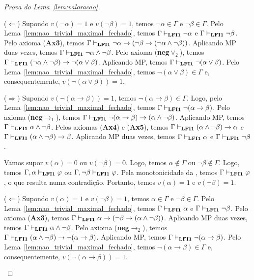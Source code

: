 \begin{proof}[Prova do Lema~\ref{lem:valoracao}]
\begin{provaporcasos}
\begin{adjustwidth}{1cm}{}
                        \noindent ($\Longleftarrow$) Supondo $v(\neg \alpha) = 1$ e $v(\neg \beta) = 1$, temos $\neg \alpha \in \Gamma$ e $\neg \beta \in \Gamma$. Pelo Lema~\ref{lem:nao_trivial_maximal_fechado}, temos $\Gamma \vdash_{{\normalfont\textbf{LFI1}}{}} \neg \alpha$ e $\Gamma \vdash_{{\normalfont\textbf{LFI1}}{}} \neg \beta$. Pelo axioma (\textbf{Ax3}), temos $\Gamma \vdash_{{\normalfont\textbf{LFI1}}{}} \neg \alpha \to (\neg \beta \to (\neg \alpha \land \neg \beta))$. Aplicando MP duas vezes, temos $\Gamma \vdash_{{\normalfont\textbf{LFI1}}{}} \neg \alpha \land \neg \beta$. Pelo axioma (\textbf{neg}$\lor_2$), temos $\Gamma \vdash_{{\normalfont\textbf{LFI1}}{}} (\neg \alpha \land \neg \beta) \to \neg (\alpha \lor \beta)$. Aplicando MP, temos $\Gamma \vdash_{{\normalfont\textbf{LFI1}}{}} \neg (\alpha \lor \beta)$. Pelo Lema~\ref{lem:nao_trivial_maximal_fechado}, temos $\neg (\alpha \lor \beta) \in \Gamma$ e, consequentemente, $v(\neg (\alpha \lor \beta)) = 1$.

                    \end{adjustwidth}


                    \begin{adjustwidth}{1cm}{}
                        
                        \noindent ($\Longrightarrow$) Supondo $v(\neg (\alpha \to \beta)) = 1$, temos $\neg (\alpha \to \beta) \in \Gamma$. Logo, pelo Lema~\ref{lem:nao_trivial_maximal_fechado}, temos $\Gamma \vdash_{{\normalfont\textbf{LFI1}}{}} \neg (\alpha \to \beta)$. Pelo axioma (\textbf{neg}$\to_1$), temos $\Gamma \vdash_{{\normalfont\textbf{LFI1}}{}} \neg (\alpha \to \beta) \to (\alpha \land \neg \beta)$. Aplicando MP, temos $\Gamma \vdash_{{\normalfont\textbf{LFI1}}{}} \alpha \land \neg \beta$. Pelos axiomas (\textbf{Ax4}) e (\textbf{Ax5}), temos $\Gamma \vdash_{{\normalfont\textbf{LFI1}}{}} (\alpha \land \neg \beta) \to \alpha$ e $\Gamma \vdash_{{\normalfont\textbf{LFI1}}{}} (\alpha \land \neg \beta) \to \beta$. Aplicando MP duas vezes, temos $\Gamma \vdash_{{\normalfont\textbf{LFI1}}{}} \alpha$ e $\Gamma \vdash_{{\normalfont\textbf{LFI1}}{}} \neg \beta$.

                        \noindent Vamos supor $v(\alpha) = 0$ ou $v(\neg \beta) = 0$. Logo, temos $\alpha \not \in \Gamma$ ou $\neg \beta \not \in \Gamma$. Logo, temos $\Gamma, \alpha \vdash_{{\normalfont\textbf{LFI1}}{}} \varphi$ ou $\Gamma, \neg \beta \vdash_{{\normalfont\textbf{LFI1}}{}} \varphi$. Pela monotonicidade da \lfium{}, temos $\Gamma \vdash_{{\normalfont\textbf{LFI1}}{}} \varphi$, o que resulta numa contradição. Portanto, temos $v(\alpha) = 1$ e $v(\neg \beta) = 1$.

                        \noindent ($\Longleftarrow$) Supondo $v(\alpha) = 1$ e $v(\neg \beta) = 1$, temos $\alpha \in \Gamma$ e $\neg \beta \in \Gamma$. Pelo Lema~\ref{lem:nao_trivial_maximal_fechado}, temos $\Gamma \vdash_{{\normalfont\textbf{LFI1}}{}} \alpha$ e $\Gamma \vdash_{{\normalfont\textbf{LFI1}}{}} \neg \beta$. Pelo axioma (\textbf{Ax3}), temos $\Gamma \vdash_{{\normalfont\textbf{LFI1}}{}} \alpha \to (\neg \beta \to (\alpha \land \neg \beta))$. Aplicando MP duas vezes, temos $\Gamma \vdash_{{\normalfont\textbf{LFI1}}{}} \alpha \land \neg \beta$. Pelo axioma (\textbf{neg}$\to_2$), temos $\Gamma \vdash_{{\normalfont\textbf{LFI1}}{}} (\alpha \land \neg \beta) \to \neg (\alpha \to \beta)$. Aplicando MP, temos $\Gamma \vdash_{{\normalfont\textbf{LFI1}}{}} \neg (\alpha \to \beta)$. Pelo Lema~\ref{lem:nao_trivial_maximal_fechado}, temos $\neg (\alpha \to \beta) \in \Gamma$ e, consequentemente, $v(\neg (\alpha \to \beta)) = 1$.



\end{adjustwidth}
\end{provaporcasos}
\end{proof}
